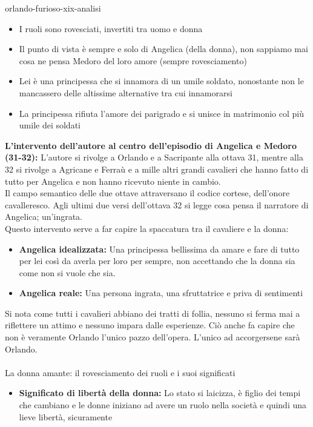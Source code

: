 \documentclass[preview]{standalone}
\begin{document}
\begin{snippet}{orlando-furioso-xix-analisi}
\begin{itemize}
        \item I ruoli sono rovesciati, invertiti tra uomo e donna
        \item Il punto di vista è sempre e solo di Angelica (della donna), non sappiamo mai cosa ne pensa Medoro del loro amore (sempre rovesciamento)
        \item Lei è una principessa che si innamora di un umile soldato, nonostante non le mancassero delle altissime alternative tra cui innamorarsi
        \item La principessa rifiuta l'amore dei parigrado e si unisce in matrimonio col più umile dei soldati
    \end{itemize}

    \textbf{L'intervento dell'autore al centro dell'episodio di Angelica e Medoro (31-32):}
    L'autore si rivolge a Orlando e a Sacripante alla ottava 31, mentre alla 32 si rivolge a Agricane e
    Ferraù e a mille altri grandi cavalieri che hanno fatto di tutto per Angelica e non hanno ricevuto
    niente in cambio. \\
    Il campo semantico delle due ottave attraversano il codice cortese, dell'onore cavalleresco.
    Agli ultimi due versi dell'ottava 32 si legge cosa pensa il narratore di Angelica; un'ingrata.
    \\
    Questo intervento serve a far capire la spaccatura tra il cavaliere e la donna:
    \begin{itemize}
        \item \textbf{Angelica idealizzata:} Una principessa bellissima da amare e fare di tutto per lei così da
        averla per loro per sempre, non accettando che la donna sia come non si vuole che sia.
        \item \textbf{Angelica reale:} Una persona ingrata, una sfruttatrice e priva di sentimenti
    \end{itemize}
    Si nota come tutti i cavalieri abbiano dei tratti di follia, nessuno si ferma mai a riflettere un
    attimo e nessuno impara dalle esperienze. Ciò anche fa capire che non è veramente Orlando
    l'unico pazzo dell'opera. L'unico ad accorgersene sarà Orlando.
    \\\\
    La donna amante: il rovesciamento dei ruoli e i suoi significati
    \begin{itemize}
        \item \textbf{Significato di libertà della donna:} Lo stato si laicizza, è figlio dei tempi che cambiano e le
        donne iniziano ad avere un ruolo nella società e quindi una lieve libertà, sicuramente

\end{itemize}
\end{snippet}
\end{document}
